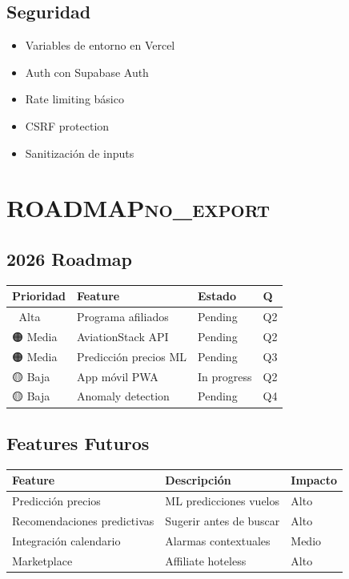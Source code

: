 \documentclass[11pt]{article}
\begin{document}
\subsection{Seguridad}
\label{sec:org4e291c5}

\begin{itemize}
\item Variables de entorno en Vercel
\item Auth con Supabase Auth
\item Rate limiting básico
\item CSRF protection
\item Sanitización de inputs
\end{itemize}

\section{ROADMAP\hfill{}\textsc{no\_export}}
\label{sec:org246f1d0}
\subsection{2026 Roadmap}
\label{sec:orgb4ec0a3}

\begin{center}
\begin{tabular}{llll}
Prioridad & Feature & Estado & Q\\
\hline
🔴 Alta & Programa afiliados & Pending & Q2\\
🟠 Media & AviationStack API & Pending & Q2\\
🟠 Media & Predicción precios ML & Pending & Q3\\
🟡 Baja & App móvil PWA & In progress & Q2\\
🟡 Baja & Anomaly detection & Pending & Q4\\
\end{tabular}
\end{center}

\subsection{Features Futuros}
\label{sec:org6fd5b87}

\begin{center}
\begin{tabular}{lll}
Feature & Descripción & Impacto\\
\hline
Predicción precios & ML predicciones vuelos & Alto\\
Recomendaciones predictivas & Sugerir antes de buscar & Alto\\
Integración calendario & Alarmas contextuales & Medio\\
Marketplace & Affiliate hoteless & Alto\\
\end{tabular}
\end{center}
\end{document}
